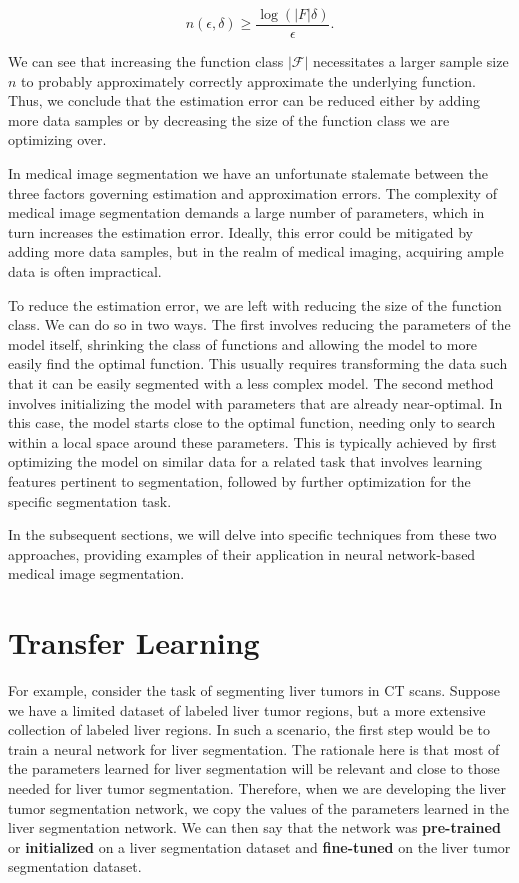 \begin{equation}
	n(\epsilon, \delta) \geq \frac{\log(\lvert F \rvert \delta)}{\epsilon}.
\end{equation}

We can see that increasing the function class $\lvert \mathcal{F} \rvert$ necessitates a larger sample size $n$ to probably approximately correctly approximate the underlying function. Thus, we conclude that the estimation error can be reduced either by adding more data samples or by decreasing the size of the function class we are optimizing over.

In medical image segmentation we have an unfortunate stalemate between the three factors governing estimation and approximation errors. The complexity of medical image segmentation demands a large number of parameters, which in turn increases the estimation error. Ideally, this error could be mitigated by adding more data samples, but in the realm of medical imaging, acquiring ample data is often impractical.

To reduce the estimation error, we are left with reducing the size of the function class. We can do so in two ways. The first involves reducing the parameters of the model itself, shrinking the class of functions and allowing the model to more easily find the optimal function. This usually requires transforming the data such that it can be easily segmented with a less complex model. The second method involves initializing the model with parameters that are already near-optimal. In this case, the model starts close to the optimal function, needing only to search within a local space around these parameters. This is typically achieved by first optimizing the model on similar data for a related task that involves learning features pertinent to segmentation, followed by further optimization for the specific segmentation task.

In the subsequent sections, we will delve into specific techniques from these two approaches, providing examples of their application in neural network-based medical image segmentation.

\section{Transfer Learning}

For example, consider the task of segmenting liver tumors in CT scans. Suppose we have a limited dataset of labeled liver tumor regions, but a more extensive collection of labeled liver regions. In such a scenario, the first step would be to train a neural network for liver segmentation. The rationale here is that most of the parameters learned for liver segmentation will be relevant and close to those needed for liver tumor segmentation. Therefore, when we are developing the liver tumor segmentation network, we copy the values of the parameters learned in the liver segmentation network. We can then say that the network was \textbf{pre-trained} or \textbf{initialized} on a liver segmentation dataset and \textbf{fine-tuned} on the liver tumor segmentation dataset.

